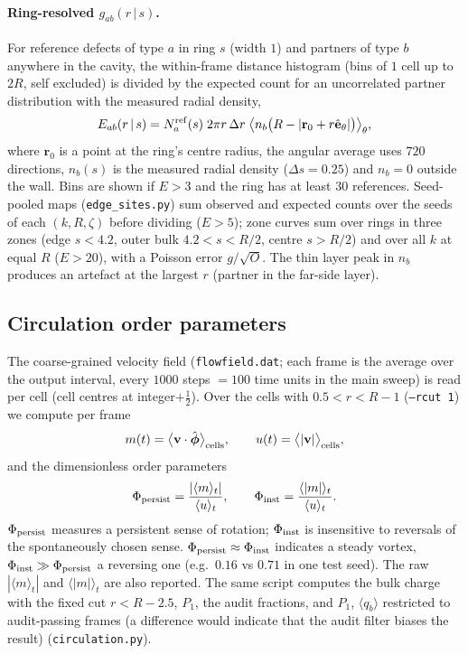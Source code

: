 \paragraph{Ring-resolved $g_{ab}(r\,|\,s)$.}
For reference defects of type $a$ in ring $s$ (width $1$) and partners of type $b$ anywhere in the cavity,
the within-frame distance histogram (bins of $1$ cell up to $2R$, self excluded) is divided by the expected
count for an uncorrelated partner distribution with the measured radial density,
\begin{equation}
  E_{ab}(r\,|\,s) = N^{\rm ref}_a(s)\;2\pi r\,\Delta r\;\big\langle n_b\big(R-|\mathbf{r}_0+r\hat{\mathbf{e}}_\theta|\big)\big\rangle_\theta ,
\end{equation}
where $\mathbf{r}_0$ is a point at the ring's centre radius, the angular average uses $720$ directions,
$n_b(s)$ is the measured radial density ($\Delta s=0.25$) and $n_b=0$ outside the wall. Bins are shown if
$E>3$ and the ring has at least $30$ references. Seed-pooled maps (\texttt{edge\_sites.py}) sum observed and
expected counts over the seeds of each $(k,R,\zeta)$ before dividing ($E>5$); zone curves sum over rings in
three zones (edge $s<4.2$, outer bulk $4.2<s<R/2$, centre $s>R/2$) and over all $k$ at equal $R$ ($E>20$), with
a Poisson error $g/\sqrt{O}$. The thin layer peak in $n_b$ produces an artefact at the largest $r$ (partner in
the far-side layer).

\subsection{Circulation order parameters}
\label{sec:methods-circ}

The coarse-grained velocity field (\texttt{flowfield.dat}; each frame is the average over the output
interval, every $1000$ steps $=100$ time units in the main sweep) is read per cell (cell centres at
integer$+\tfrac12$). Over the cells with $0.5<r<R-1$ (\texttt{--rcut 1}) we compute per frame
\begin{equation}
  m(t) = \big\langle \mathbf{v}\cdot\hat{\boldsymbol\phi}\big\rangle_{\rm cells},\qquad
  u(t) = \big\langle |\mathbf{v}|\big\rangle_{\rm cells},
\end{equation}
and the dimensionless order parameters
\begin{equation}
  \Phi_{\rm persist} = \frac{|\langle m\rangle_t|}{\langle u\rangle_t},\qquad
  \Phi_{\rm inst} = \frac{\langle |m|\rangle_t}{\langle u\rangle_t}.
\end{equation}
$\Phi_{\rm persist}$ measures a persistent sense of rotation; $\Phi_{\rm inst}$ is insensitive to
reversals of the spontaneously chosen sense. $\Phi_{\rm persist}\approx\Phi_{\rm inst}$ indicates a steady vortex,
$\Phi_{\rm inst}\gg\Phi_{\rm persist}$ a reversing one (e.g.\ $0.16$ vs $0.71$ in one test seed). The raw
$|\langle m\rangle_t|$ and $\langle|m|\rangle_t$ are also reported. The same script computes the bulk charge with
the fixed cut $r<R-2.5$, $P_1$, the audit fractions, and $P_1$, $\langle q_b\rangle$ restricted to audit-passing
frames (a difference would indicate that the audit filter biases the result) (\texttt{circulation.py}).

